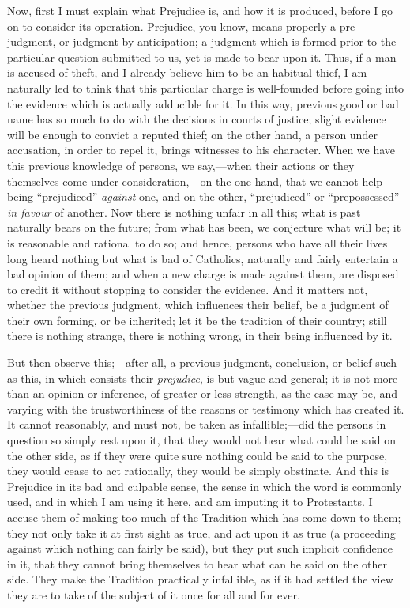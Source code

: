 Now, first I must explain what Prejudice is, and how
it is produced, before I go on to consider its operation.
Prejudice, you know, means properly a pre-judgment, or
judgment by anticipation; a judgment which is formed
prior to the particular question submitted to us, yet is
made to bear upon it. Thus, if a man is accused of theft,
and I already believe him to be an habitual thief, I am
naturally led to think that this particular charge is
well-founded before going into the evidence which is
actually adducible for it. In this way, previous good or
bad name has so much to do with the decisions in courts
of justice; slight evidence will be enough to convict a
reputed thief; on the other hand, a person under
accusation, in order to repel it, brings witnesses to his
character. When we have this previous knowledge of
persons, we say,—when their actions or they
themselves come under consideration,—on the one
hand, that we cannot help being ``prejudiced'' \emph{against}
one, and on the other, ``prejudiced'' or
``prepossessed'' \emph{in favour} of another.
Now there is nothing unfair in all this; what is past
naturally bears on the future; from what has been, we
conjecture what will be; it is reasonable and rational to
do so; and hence, persons who have all their lives long
heard nothing but what is bad of Catholics, naturally and
fairly entertain a bad opinion of them; and when a new
charge is made against them, are disposed to credit it
without stopping to consider the evidence. And it matters
not, whether the previous judgment, which influences
their belief, be a judgment of their own forming, or be
inherited; let it be the tradition of their country;
still there is nothing strange, there is nothing wrong,
in their being influenced by it.

But then observe this;—after all, a previous
judgment, conclusion, or belief such as this, in which
consists their \emph{prejudice}, is but vague and
general; it is not more than an opinion or inference, of
greater or less strength, as the case may be, and varying
with the trustworthiness of the reasons or testimony
which has created it. It cannot reasonably, and must not,
be taken as infallible;—did the persons in question
so simply rest upon it, that they would not hear what
could be said on the other side, as if they were quite
sure nothing could be said to the purpose, they would
cease to act rationally, they would be simply obstinate.
And this is Prejudice in its bad and culpable sense, the
sense in which the word is commonly used, and in which I
am using it here, and am imputing it to Protestants. I
accuse them of making too much of the Tradition which has
come down to them; they not only take it at first sight
as true, and act upon it as true (a proceeding against
which nothing can fairly be said), but they put such
implicit confidence in it, that they cannot bring
themselves to hear what can be said on the other side.
They make the Tradition practically infallible, as if it
had settled the view they are to take of the subject of
it once for all and for ever.

